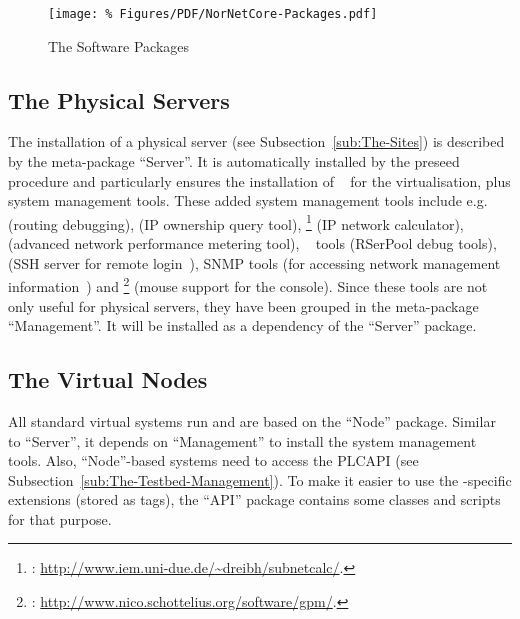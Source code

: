 \begin{figure*}
\begin{center}
\texttt{[image: \%
   Figures/PDF/NorNetCore-Packages.pdf]}
\end{center}
\caption{The Software Packages}
\label{cap:The-Software-Packages}
\end{figure*}


\subsection{The Physical Servers}

The installation of a physical server (see Subsection~\ref{sub:The-Sites}) is described by the meta-package ``Server''. It is automatically installed by the preseed procedure and particularly ensures the installation of ~\cite{VirtualBoxUserManual} for the virtualisation, plus system management tools.
These added system management tools include e.g.\  (routing debugging),  (IP ownership query tool), \footnote{: \url{http://www.iem.uni-due.de/~dreibh/subnetcalc/}.} (IP network calculator), ~\cite{SoftCOM2011} (advanced network performance metering tool), ~\cite{Dre2006} tools (RSerPool debug tools),  (SSH server for remote login~\cite{RFC4254}), SNMP tools (for accessing network management information~\cite{RFC3411}) and \footnote{: \url{http://www.nico.schottelius.org/software/gpm/}.} (mouse support for the console). Since these tools are not only useful for physical servers, they have been grouped in the meta-package ``Management''. It will be installed as a dependency of the ``Server'' package.


\subsection{The Virtual Nodes}
\label{sub:The-Nodes}

All standard virtual  systems run  and are based on the ``Node'' package. Similar to ``Server'', it depends on ``Management'' to install the system management tools. Also, ``Node''-based systems need to access the PLCAPI (see Subsection~\ref{sub:The-Testbed-Management}). To make it easier to use the -specific extensions (stored as tags), the ``API'' package contains some  classes and scripts for that purpose.

